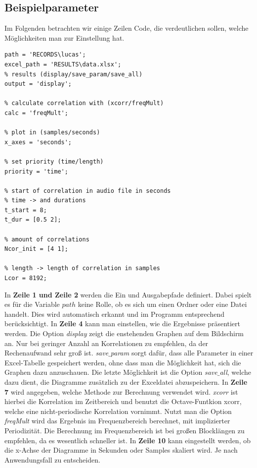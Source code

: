 \subsection{Beispielparameter}
Im Folgenden betrachten wir einige Zeilen Code, die verdeutlichen sollen, welche Möglichkeiten man zur Einstellung hat.
\begin{lstlisting}
path = 'RECORDS\lucas';
excel_path = 'RESULTS\data.xlsx';
% results (display/save_param/save_all)
output = 'display';

% calculate correlation with (xcorr/freqMult)
calc = 'freqMult';

% plot in (samples/seconds)
x_axes = 'seconds';

% set priority (time/length)
priority = 'time';

% start of correlation in audio file in seconds
% time -> and durations 
t_start = 8;
t_dur = [0.5 2];

% amount of correlations 
Ncor_init = [4 1];

% length -> length of correlation in samples
Lcor = 8192; 
\end{lstlisting}
In \textbf{Zeile 1 und Zeile 2} werden die Ein und Ausgabepfade definiert. Dabei spielt es für die Variable $path$ keine Rolle, ob es sich um einen Ordner oder eine Datei handelt. Dies wird automatisch erkannt und im Programm entsprechend berücksichtigt.\newline
In \textbf{Zeile 4} kann man einstellen, wie die Ergebnisse präsentiert werden. Die Option \textit{display} zeigt die enstehenden Graphen auf dem Bildschirm an. Nur bei geringer Anzahl an Korrelationen zu empfehlen, da der Rechenaufwand sehr groß ist. \textit{save$\_$param} sorgt dafür, dass alle Parameter in einer Excel-Tabelle gespeichert werden, ohne dass man die Möglichkeit hat, sich die Graphen dazu anzuschauen. Die letzte Möglichkeit ist die Option \textit{save$\_$all}, welche dazu dient, die Diagramme zusätzlich zu der Exceldatei abzuspeichern.\newline
In \textbf{Zeile 7} wird angegeben, welche Methode zur Berechnung verwendet wird. \textit{xcorr} ist hierbei die Korrelation im Zeitbereich und benutzt die Octave-Funtkion xcorr, welche eine nicht-periodische Korrelation vornimmt. Nutzt man die Option \textit{freqMult} wird das Ergebnis im Frequenzbereich berechnet, mit implizierter Periodizität. Die Berechnung im Frequenzbereich ist bei großen Blocklängen zu empfehlen, da es wesentlich schneller ist.\newline
In \textbf{Zeile 10} kann eingestellt werden, ob die x-Achse der Diagramme in Sekunden oder Samples skaliert wird. Je nach Anwendungsfall zu entscheiden.\newline
